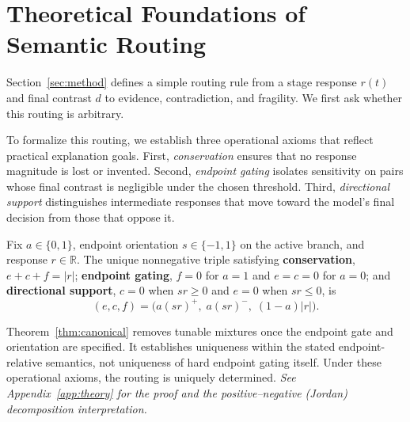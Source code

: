 \section{Theoretical Foundations of Semantic Routing}
\label{sec:theory}

Section~\ref{sec:method} defines a simple routing rule from a stage response
$r(t)$ and final contrast $d$ to evidence, contradiction, and fragility.
We first ask whether this routing is arbitrary.

To formalize this routing, we establish three operational axioms that reflect practical explanation goals. First, \emph{conservation} ensures that no response magnitude is lost or invented. Second, \emph{endpoint gating} isolates sensitivity on pairs whose final contrast is negligible under the chosen threshold. Third, \emph{directional support} distinguishes intermediate responses that move toward the model's final decision from those that oppose it. 

\begin{theorem}
\label{thm:canonical}
Fix $a\in\{0,1\}$, endpoint orientation $s\in\{-1,1\}$ on the active branch, and response $r\in\mathbb{R}$. The unique nonnegative triple satisfying \textbf{conservation}, $e+c+f=|r|$; \textbf{endpoint gating}, $f=0$ for $a=1$ and $e=c=0$ for $a=0$; and \textbf{directional support}, $c=0$ when $sr\geq0$ and $e=0$ when $sr\leq0$, is
\[
(e,c,f)=\bigl(a(sr)^{+},\;a(sr)^{-},\;(1-a)|r|\bigr).
\]
\end{theorem}

Theorem~\ref{thm:canonical} removes tunable mixtures once the endpoint gate and orientation are specified. It establishes uniqueness within the stated endpoint-relative semantics, not uniqueness of hard endpoint gating itself. Under these operational axioms, the routing is uniquely determined. \emph{See Appendix~\ref{app:theory} for the proof and the positive--negative (Jordan) decomposition interpretation.}

